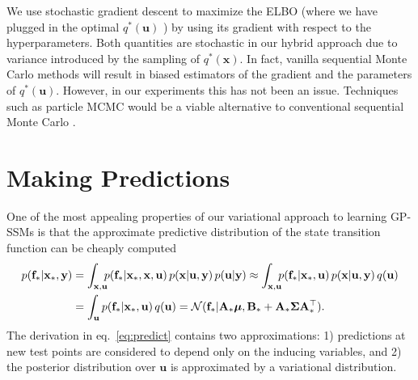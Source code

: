 \documentclass{article} %
\newcommand{\n}[1]{\mathbf{#1}}
\newcommand{\x}{\mathbf{x}}
\newcommand{\y}{\mathbf{y}}
\newcommand{\bSigma}{\boldsymbol\Sigma}
\begin{document}
We use stochastic gradient descent \citep{hoffman2013stochastic} to maximize the ELBO (where we have plugged in the optimal $q^*(\n{u})$ \citep{Titsias2009}) by using its gradient with respect to the hyperparameters. Both quantities are stochastic in our hybrid approach due to variance introduced by the sampling of $q^*(\x)$. In fact, vanilla sequential Monte Carlo methods will result in biased estimators of the gradient and the parameters of $q^*(\n{u})$. However, in our experiments this has not been an issue. Techniques such as particle MCMC would be a viable alternative to conventional sequential Monte Carlo \citep{Lindsten2013FAT}.













\section{Making Predictions}

One of the most appealing properties of our variational approach to learning GP-SSMs is that the approximate predictive distribution of the state transition function can be cheaply computed
\begin{align}
p(\n{f}_* | \x_*, \y) &=  \int_{\x,\n{u}} \!\!\! p(\n{f}_* | \x_*, \x, \n{u}) \, p(\x | \n{u},\y) \, p(\n{u} | \y) \approx \int_{\x,\n{u}}  \!\!\! p(\n{f}_* | \x_*, \n{u}) \, p(\x | \n{u},\y) \, q(\n{u}) \nonumber \\
&= \int_{\n{u}}  p(\n{f}_* | \x_*, \n{u}) \, q(\n{u}) = \mathcal{N}(\n{f}_* | \n{A}_* \bmu, \n{B}_* + \n{A}_* \bSigma \n{A}^\top_* ). \label{eq:predict}
\end{align}
The derivation in eq.~\eqref{eq:predict} contains two approximations: 1) predictions at new test points are considered to depend only on the inducing variables, and 2) the posterior distribution over $\n{u}$ is approximated by a variational distribution.
\end{document}
